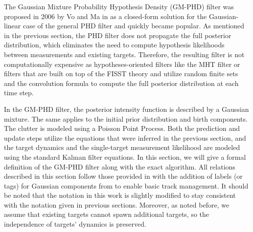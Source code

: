The Gaussian Mixture Probability Hypothesis Density (GM-PHD) filter was proposed in 2006 by Vo and Ma in \cite{voGaussianMixtureProbability2006} as a closed-form solution for the Gaussian-linear case of the general PHD filter and quickly became popular. As mentioned in the previous section, the PHD filter does not propagate the full posterior distribution, which eliminates the need to compute hypothesis likelihoods between measurements and existing targets. Therefore, the resulting filter is not computationally expensive as hypotheses-oriented filters like the MHT filter or filters that are built on top of the FISST theory and utilize random finite sets and the convolution formula to compute the full posterior distribution at each time step.

In the GM-PHD filter, the posterior intensity function is described by a Gaussian mixture. The same applies to the initial prior distribution and birth components. The clutter is modeled using a Poisson Point Process. Both the prediction and update steps utilize the equations that were inferred in the previous section, and the target dynamics and the single-target measurement likelihood are modeled using the standard Kalman filter equations. In this section, we will give a formal definition of the GM-PHD filter along with the exact algorithm. All relations described in this section follow those provided in \cite{voGaussianMixtureProbability2006} with the addition of labels (or tags) for Gaussian components from \cite{clarkGMPHDFilterMultiple2006} to enable basic track management. It should be noted that the notation in this work is slightly modified to stay consistent with the notation given in previous sections. Moreover, as noted before, we assume that existing targets cannot spawn additional targets, so the independence of targets' dynamics is preserved.
